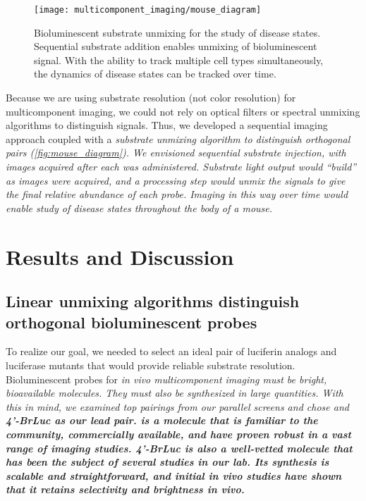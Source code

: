\begin{figure}[htbp]
\texttt{[image: multicomponent\_imaging/mouse\_diagram]}
\centering
\caption[Bioluminescent substrate unmixing for the study of disease states]{
Bioluminescent substrate unmixing for the study of disease states. Sequential substrate addition enables unmixing of bioluminescent signal. With the ability to track multiple cell types simultaneously, the dynamics of disease states can be tracked over time.
}
  \label{fig:mouse_diagram}
\end{figure}

Because we are using substrate resolution (not color resolution) for multicomponent imaging, we could not rely on optical filters or spectral unmixing algorithms to distinguish signals. Thus, we developed a sequential imaging approach coupled with a \it{substrate} unmixing algorithm to distinguish orthogonal pairs (\autoref{fig:mouse_diagram}). We envisioned sequential substrate injection, with images acquired after each was administered. Substrate light output would ``build''  as images were acquired, and a processing step would unmix the signals to give the final relative abundance of each probe. Imaging in this way over time would enable study of disease states throughout the body of a mouse.

\section{Results and Discussion}
\subsection{Linear unmixing algorithms distinguish orthogonal bioluminescent probes}
To realize our goal, we needed to select an ideal pair of luciferin analogs and luciferase mutants that would provide reliable substrate resolution.
Bioluminescent probes for \it{in vivo} multicomponent imaging must be bright, bioavailable molecules. They must also be synthesized in large quantities. With this in mind, we examined top pairings from our parallel screens\cite{RathbunParallelScreeningRapid2017} and chose \dluc{} and \bf{4'-BrLuc} as our lead pair.
\dluciferin{} is a molecule that is familiar to the community, commercially available, and have proven robust in a vast range of imaging studies.\cite{PaleyBioluminescenceversatiletechnique2014}
\bf{4'-BrLuc} is also a well-vetted molecule that has been the subject of several studies in our lab. Its synthesis is scalable and straightforward,\cite{SteinhardtBrominatedLuciferinsAre2016} and initial \it{in vivo} studies have shown that it retains selectivity and brightness \it{in vivo.}\cite{RathbunParallelScreeningRapid2017}


